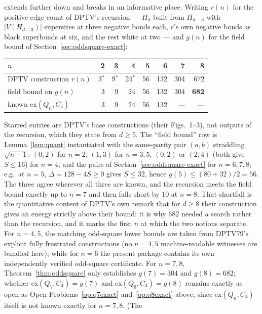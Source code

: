 \documentclass[12pt]{article}
\newcommand{\ex}{\mathrm{ex}}
\begin{document}
\begin{enumerate}
    extends further down and breaks in an informative place. Writing
    $r(n)$ for the positive-edge count of DPTV's recursion --- $H_d$ built
    from $H_{d-3}$ with $|V(H_{d-3})|$ supersites at three negative bonds
    each, $r$'s own negative bonds as black superbonds at six, and the rest
    white at two --- and $g(n)$ for the field bound of
    Section~\ref{sec:oddsquare-exact}:
    \begin{center}\small
    \begin{tabular}{lrrrrrrr}
    \toprule
    $n$ & 2 & 3 & 4 & 5 & 6 & 7 & 8\\
    \midrule
    DPTV construction $r(n)$ & 3$^{*}$ & 9$^{*}$ & 24$^{*}$ & 56 & 132 & 304 & 672\\
    field bound on $g(n)$ & 3 & 9 & 24 & 56 & 132 & 304 & \textbf{682}\\
    known $\ex(Q_n,C_4)$ & 3 & 9 & 24 & 56 & 132 & --- & ---\\
    \bottomrule
    \end{tabular}
    \end{center}
    Starred entries are DPTV's base constructions (their Figs.~1--3), not
    outputs of the recursion, which they state from $d\ge5$.
    The ``field bound'' row is Lemma~\ref{lem:quant} instantiated with the
    same-parity pair $(a,b)$ straddling $\sqrt{n-1}$: $(0,2)$ for $n=2$,
    $(1,3)$ for $n=3,5$, $(0,2)$ or $(2,4)$ (both give $S\le16$) for
    $n=4$, and the pairs of Section~\ref{sec:oddsquare-exact} for
    $n=6,7,8$; e.g.\ at $n=5$, $\Delta=128-4S\ge0$ gives $S\le32$, hence
    $g(5)\le(80+32)/2=56$.
    The three agree wherever all three are known, and the recursion meets
    the field bound exactly up to $n=7$ and then falls short by $10$ at
    $n=8$. That shortfall is the quantitative content of DPTV's own remark
    that for $d\ge8$ their construction gives an energy strictly above their
    bound: it is why $682$ needed a search rather than the recursion, and it
    marks the first $n$ at which the two notions separate. For $n=4,5$, the matching odd-square lower
    bounds are taken from DPTV79's explicit fully frustrated constructions
    (no $n=4,5$ machine-readable witnesses are bundled here), while for $n=6$
    the present package contains its own independently verified odd-square
    certificate. For $n=7,8$,
    Theorem~\ref{thm:oddsquare}
    only establishes $g(7)=304$ and $g(8)=682$; whether
    $\ex(Q_7,C_4)=g(7)$ and $\ex(Q_8,C_4)=g(8)$ remains exactly as open
    as Open Problems~\ref{op:q7exact} and~\ref{op:q8exact} above, since
    $\ex(Q_n,C_4)$ itself is not known exactly for $n=7,8$. (The

\end{enumerate}
\end{document}

